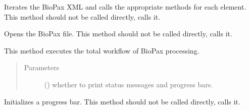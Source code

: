 \documentclass[letterpaper,10pt,english]{sphinxmanual}
\begin{document}
\begin{fulllineitems}
\begin{fulllineitems}
\end{fulllineitems}


\begin{fulllineitems}
\label{\detokenize{reference:pypath.pyreact.BioPaxReader.iterate}}
Iterates the BioPax XML and calls the appropriate methods
for each element.
This method should not be called directly,
 calls it.

\end{fulllineitems}


\begin{fulllineitems}
\label{\detokenize{reference:pypath.pyreact.BioPaxReader.open_biopax}}
Opens the BioPax file. This method should not be called directly,
 calls it.

\end{fulllineitems}


\begin{fulllineitems}
\label{\detokenize{reference:pypath.pyreact.BioPaxReader.process}}
This method executes the total workflow of BioPax processing.
\begin{quote}\begin{description}
\item[{Parameters}] \leavevmode
{} () \textendash{} whether to print status messages and progress bars.

\end{description}\end{quote}

\end{fulllineitems}


\begin{fulllineitems}
\label{\detokenize{reference:pypath.pyreact.BioPaxReader.set_progress}}
Initializes a progress bar.
This method should not be called directly,
 calls it.

\end{fulllineitems}


\end{fulllineitems}
\end{document}
